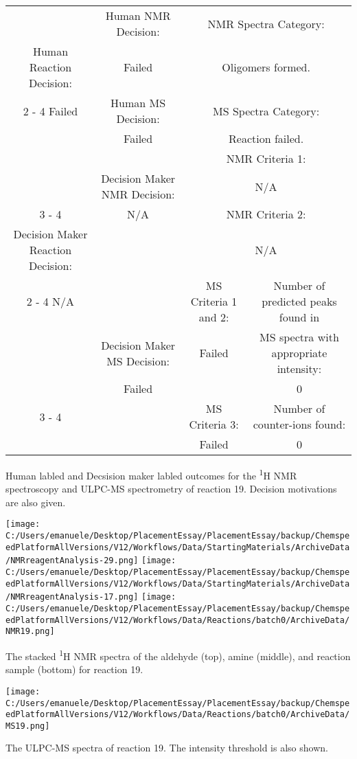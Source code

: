 \documentclass{article}%
\begin{document}
\begin{Decision Table}[H]%
\begin{tabular}{|c|c|c|c|}%
\hline%
&Human NMR Decision:&\multicolumn{2}{|c|}{NMR Spectra Category:}\\%
Human Reaction Decision:&Failed&\multicolumn{2}{|c|}{Oligomers formed.}\\%
\cline{2%
-%
4}%
Failed&Human MS Decision:&\multicolumn{2}{|c|}{MS Spectra Category:}\\%
&Failed&\multicolumn{2}{|c|}{Reaction failed.}\\%
\hline%
&&\multicolumn{2}{|c|}{NMR Criteria 1:}\\%
&Decision Maker NMR Decision:&\multicolumn{2}{|c|}{N/A}\\%
\cline{3%
-%
4}%
&N/A&\multicolumn{2}{|c|}{NMR Criteria 2:}\\%
Decision Maker Reaction Decision:&&\multicolumn{2}{|c|}{N/A}\\%
\cline{2%
-%
4}%
N/A&&MS Criteria 1 and 2:&Number of predicted peaks found in\\%
&Decision Maker MS Decision:&Failed&MS spectra with appropriate intensity:\\%
&Failed&&0\\%
\cline{3%
-%
4}%
&&MS Criteria 3:&Number of counter{-}ions found:\\%
&&Failed&0\\%
\hline%
\end{tabular}%
\caption{Human labled and Decsision maker labled outcomes for the \textsuperscript{1}H NMR spectroscopy and ULPC-MS spectrometry of reaction 19. Decision motivations are also given.}%
\end{Decision Table}%
\begin{NMR Spectra}[H]%
\begin{center}%
\texttt{[image: C:/Users/emanuele/Desktop/PlacementEssay/PlacementEssay/backup/ChemspeedPlatformAllVersions/V12/Workflows/Data/StartingMaterials/ArchiveData/NMRreagentAnalysis-29.png]}\hfill%
\texttt{[image: C:/Users/emanuele/Desktop/PlacementEssay/PlacementEssay/backup/ChemspeedPlatformAllVersions/V12/Workflows/Data/StartingMaterials/ArchiveData/NMRreagentAnalysis-17.png]}\hfill%
\texttt{[image: C:/Users/emanuele/Desktop/PlacementEssay/PlacementEssay/backup/ChemspeedPlatformAllVersions/V12/Workflows/Data/Reactions/batch0/ArchiveData/NMR19.png]}\hfill%
\end{center}%
\caption{The stacked \textsuperscript{1}H NMR spectra of the aldehyde (top), amine (middle), and reaction sample (bottom) for reaction 19.}%
\end{NMR Spectra}%
\begin{MS Spectra}[H]%
\begin{center}%
\texttt{[image: C:/Users/emanuele/Desktop/PlacementEssay/PlacementEssay/backup/ChemspeedPlatformAllVersions/V12/Workflows/Data/Reactions/batch0/ArchiveData/MS19.png]}\hfill%
\end{center}%
\caption{The ULPC-MS spectra of reaction 19. The intensity threshold is also shown.}%
\end{MS Spectra}%
\end{document}
